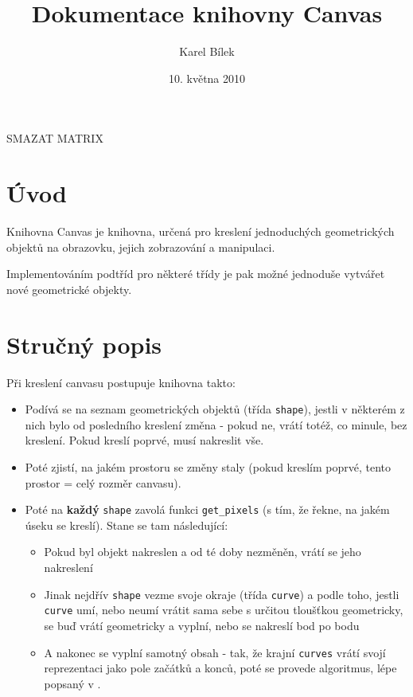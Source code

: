 \documentclass[11pt]{article} %
\begin{document}
    \title{Dokumentace knihovny Canvas}
    \author{Karel Bílek}
    \date{10. května 2010}
    \maketitle
    
    SMAZAT MATRIX
\section{Úvod}
Knihovna Canvas je knihovna, určená pro kreslení jednoduchých geometrických objektů na obrazovku, jejich zobrazování a manipulaci. 

Implementováním podtříd pro některé třídy je pak možné jednoduše vytvářet nové geometrické objekty.

\section{Stručný popis}
Při kreslení canvasu postupuje knihovna takto:

\begin{itemize}
    \item Podívá se na seznam  geometrických objektů (třída \texttt{shape}), jestli v některém z nich bylo od posledního kreslení změna - pokud ne, vrátí totéž, co minule, bez kreslení. Pokud kreslí poprvé, musí nakreslit vše.
    \item Poté zjistí, na jakém prostoru se změny staly (pokud kreslím poprvé, tento prostor = celý rozměr canvasu).
    \item Poté na \textbf{každý} \texttt{shape} zavolá funkci \texttt{get\_pixels} (s tím, že řekne, na jakém úseku se kreslí). Stane se tam následující:
    \begin{itemize}
        \item Pokud byl objekt nakreslen a od té doby nezměněn, vrátí se jeho nakreslení
        \item Jinak nejdřív \texttt{shape} vezme svoje okraje (třída \texttt{curve}) a podle toho, jestli \texttt{curve} umí, nebo neumí vrátit sama sebe s určitou tloušťkou geometricky, se buď vrátí geometricky a vyplní, nebo se nakreslí bod po bodu
        \item A nakonec se vyplní samotný obsah - tak, že krajní \texttt{curves} vrátí svojí reprezentaci jako pole začátků a konců, poté se provede algoritmus, lépe popsaný v \cite{Pelikan}.
    \end{itemize}
\end{itemize}
\end{document}
